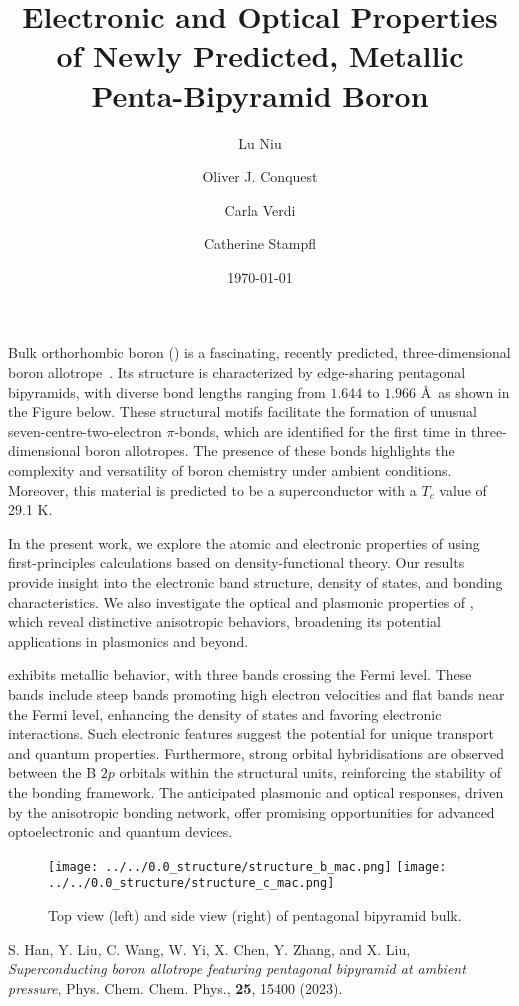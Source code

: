 \documentclass[12pt]{article}
\title{Electronic and Optical Properties of Newly Predicted, Metallic Penta-Bipyramid Boron}
\author[1]{Lu Niu}
\author[1]{Oliver J. Conquest}
\author[1,2]{Carla Verdi}
\author[1*]{Catherine Stampfl}
\affil[1]{School of Physics, The University of Sydney, Sydney 2006, NSW, Australia}
\affil[2]{School of Mathematics and Physics, The University of Queensland, Brisbane, Queensland 4072, Australia}
\date{\today}
\begin{document}
\maketitle

\par Bulk orthorhombic boron () is a fascinating, recently predicted, three-dimensional boron allotrope~\cite{bulk_boron}. 
Its structure is characterized by edge-sharing pentagonal bipyramids, with diverse bond lengths ranging from $1.644$ to $1.966$ \AA\ as shown in the Figure below.
These structural motifs facilitate the formation of unusual seven-centre-two-electron $\pi$-bonds, which are identified for the first time in three-dimensional boron allotropes.
The presence of these bonds highlights the complexity and versatility of boron chemistry under ambient conditions.
Moreover, this material is predicted to be a superconductor with a $T_c$ value of 29.1 K.

\par In the present work, we explore the atomic and electronic properties of  using first-principles calculations based on density-functional theory. Our results provide insight into the electronic band structure, density of states, and bonding characteristics. We also investigate the optical and plasmonic properties of , which reveal distinctive anisotropic behaviors, broadening its potential applications in plasmonics and beyond.

\par {} exhibits metallic behavior, with three bands crossing the Fermi level.
These bands include steep bands promoting high electron velocities and flat bands near the Fermi level, enhancing the density of states and favoring electronic interactions. Such electronic features suggest the potential for unique transport and quantum properties.
Furthermore, strong orbital hybridisations are observed between the B $2p$ orbitals within the structural units, reinforcing the stability of the bonding framework. The anticipated plasmonic and optical responses, driven by the anisotropic bonding network, offer promising opportunities for advanced optoelectronic and quantum devices.

\begin{figure}[h!]
    \centering
    \texttt{[image: ../../0.0\_structure/structure\_b\_mac.png]}\hfill
    \texttt{[image: ../../0.0\_structure/structure\_c\_mac.png]}
    \caption{Top view (left) and side view (right) of  pentagonal bipyramid bulk.}
    \label{fig:o-b14_views}
\end{figure}

\begin{thebibliography}{01}
     S. Han, Y. Liu, C. Wang, W. Yi, X. Chen, Y. Zhang, and X. Liu, 
    \textit{Superconducting boron allotrope featuring pentagonal bipyramid at ambient pressure}, Phys. Chem. Chem. Phys., \textbf{25}, 15400 (2023).
\end{thebibliography}
\end{document}
